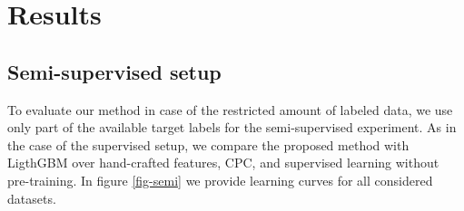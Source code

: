 \documentclass{article}
\begin{document}
\section{Results} \label{app-sec-res}

\subsection{Semi-supervised setup} \label{app-sec-semi}

To evaluate our method in case of the restricted amount of labeled data, we use only part of the available target labels for the semi-supervised experiment. As in the case of the supervised setup, we compare the proposed method with LigthGBM over hand-crafted features, CPC, and supervised learning without pre-training. In figure \ref{fig-semi} we provide learning curves for all considered datasets.
\end{document}

